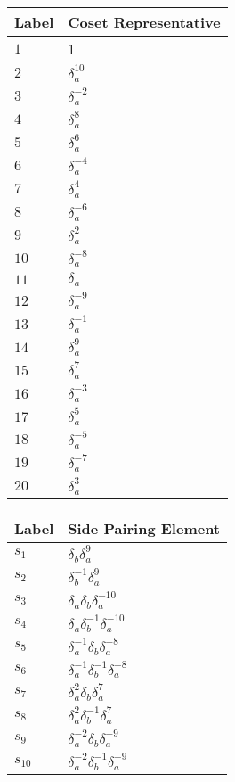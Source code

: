 \documentclass{article}
\begin{document}
\begin{center}
\begin{tabular}{ll}
\toprule
Label & Coset Representative\\
\midrule
$1$ & 1 \\
$2$ & $\delta_a^{10}$ \\
$3$ & $\delta_a^{-2}$ \\
$4$ & $\delta_a^{8}$ \\
$5$ & $\delta_a^{6}$ \\
$6$ & $\delta_a^{-4}$ \\
$7$ & $\delta_a^{4}$ \\
$8$ & $\delta_a^{-6}$ \\
$9$ & $\delta_a^{2}$ \\
$10$ & $\delta_a^{-8}$ \\
$11$ & $\delta_a^{}$ \\
$12$ & $\delta_a^{-9}$ \\
$13$ & $\delta_a^{-1}$ \\
$14$ & $\delta_a^{9}$ \\
$15$ & $\delta_a^{7}$ \\
$16$ & $\delta_a^{-3}$ \\
$17$ & $\delta_a^{5}$ \\
$18$ & $\delta_a^{-5}$ \\
$19$ & $\delta_a^{-7}$ \\
$20$ & $\delta_a^{3}$ \\
\bottomrule
\end{tabular}
\hfill
\begin{tabular}{ll}
\toprule
Label & Side Pairing Element\\
\midrule
$s_{1}$ & $\delta_b^{}\delta_a^{9}$ \\
$s_{2}$ & $\delta_b^{-1}\delta_a^{9}$ \\
$s_{3}$ & $\delta_a^{}\delta_b^{}\delta_a^{-10}$ \\
$s_{4}$ & $\delta_a^{}\delta_b^{-1}\delta_a^{-10}$ \\
$s_{5}$ & $\delta_a^{-1}\delta_b^{}\delta_a^{-8}$ \\
$s_{6}$ & $\delta_a^{-1}\delta_b^{-1}\delta_a^{-8}$ \\
$s_{7}$ & $\delta_a^{2}\delta_b^{}\delta_a^{7}$ \\
$s_{8}$ & $\delta_a^{2}\delta_b^{-1}\delta_a^{7}$ \\
$s_{9}$ & $\delta_a^{-2}\delta_b^{}\delta_a^{-9}$ \\
$s_{10}$ & $\delta_a^{-2}\delta_b^{-1}\delta_a^{-9}$ \\

\end{tabular}
\end{center}
\end{document}
